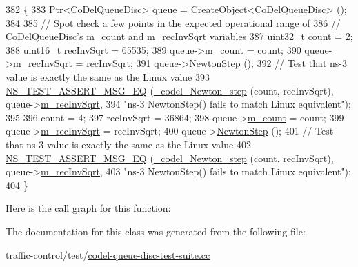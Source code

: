 \begin{DoxyCode}
382 \{
383   \hyperlink{classns3_1_1Ptr}{Ptr<CoDelQueueDisc>} queue = CreateObject<CoDelQueueDisc> ();
384 
385   \textcolor{comment}{// Spot check a few points in the expected operational range of}
386   \textcolor{comment}{// CoDelQueueDisc's m\_count and m\_recInvSqrt variables}
387   uint32\_t count = 2;
388   uint16\_t recInvSqrt = 65535;
389   queue->\hyperlink{classns3_1_1CoDelQueueDisc_a87a17c1b3df276df0a43a4270ee6515c}{m\_count} = count;
390   queue->\hyperlink{classns3_1_1CoDelQueueDisc_a348cfedf39aedbc10137a50c991df6fa}{m\_recInvSqrt} = recInvSqrt;
391   queue->\hyperlink{classns3_1_1CoDelQueueDisc_acca9bb0949833fbd55afe6591d017e18}{NewtonStep} ();
392   \textcolor{comment}{// Test that ns-3 value is exactly the same as the Linux value}
393   \hyperlink{group__testing_ga2a9d78cffb3db8e867c35fff0b698cf5}{NS\_TEST\_ASSERT\_MSG\_EQ} (\hyperlink{codel-queue-disc-test-suite_8cc_a3ba0818891ce32832dc51eceff6b9f41}{\_codel\_Newton\_step} (count, recInvSqrt), 
      queue->\hyperlink{classns3_1_1CoDelQueueDisc_a348cfedf39aedbc10137a50c991df6fa}{m\_recInvSqrt},
394                          \textcolor{stringliteral}{"ns-3 NewtonStep() fails to match Linux equivalent"});
395 
396   count = 4;
397   recInvSqrt = 36864;
398   queue->\hyperlink{classns3_1_1CoDelQueueDisc_a87a17c1b3df276df0a43a4270ee6515c}{m\_count} = count;
399   queue->\hyperlink{classns3_1_1CoDelQueueDisc_a348cfedf39aedbc10137a50c991df6fa}{m\_recInvSqrt} = recInvSqrt;
400   queue->\hyperlink{classns3_1_1CoDelQueueDisc_acca9bb0949833fbd55afe6591d017e18}{NewtonStep} ();
401   \textcolor{comment}{// Test that ns-3 value is exactly the same as the Linux value}
402   \hyperlink{group__testing_ga2a9d78cffb3db8e867c35fff0b698cf5}{NS\_TEST\_ASSERT\_MSG\_EQ} (\hyperlink{codel-queue-disc-test-suite_8cc_a3ba0818891ce32832dc51eceff6b9f41}{\_codel\_Newton\_step} (count, recInvSqrt), 
      queue->\hyperlink{classns3_1_1CoDelQueueDisc_a348cfedf39aedbc10137a50c991df6fa}{m\_recInvSqrt},
403                          \textcolor{stringliteral}{"ns-3 NewtonStep() fails to match Linux equivalent"});
404 \}
\end{DoxyCode}


Here is the call graph for this function\+:




The documentation for this class was generated from the following file\+:\begin{DoxyCompactItemize}
\item 
traffic-\/control/test/\hyperlink{codel-queue-disc-test-suite_8cc}{codel-\/queue-\/disc-\/test-\/suite.\+cc}\end{DoxyCompactItemize}
